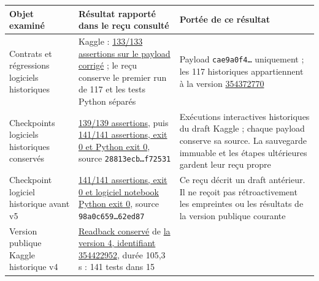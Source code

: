 \documentclass[
  canadien,
  11pt,
  a4paper,
]{report}
\newcounter{none} %
\begin{document}
{\def\LTcaptype{none} %
\begin{longtable}[]{@{}
  >{\raggedright\arraybackslash}p{}
  >{\raggedright\arraybackslash}p{}
  >{\raggedright\arraybackslash}p{}@{}}
\toprule\noalign{}
\begin{minipage}[b]{\linewidth}\raggedright
Objet examiné
\end{minipage} & \begin{minipage}[b]{\linewidth}\raggedright
Résultat rapporté dans le reçu consulté
\end{minipage} & \begin{minipage}[b]{\linewidth}\raggedright
Portée de ce résultat
\end{minipage} \\
\midrule\noalign{}
\endhead
\bottomrule\noalign{}
\endlastfoot
Contrats et régressions logiciels historiques & Kaggle :
\href{../../../../receipts/formation/software-133-final.json}{133/133
assertions sur le payload corrigé} ; le reçu conserve le premier run de
117 et les tests Python séparés & Payload \texttt{cae9a0f4…} uniquement
; les 117 historiques appartiennent à la version
\href{https://www.kaggle.com/code/celebrum/orbit-formation-software-validation?scriptVersionId=354372770}{354372770} \\
Checkpoints logiciels historiques conservés &
\href{../../../../receipts/formation/software-139-kaggle.json}{139/139
assertions}, puis
\href{../../../../receipts/formation/software-141-kaggle.json}{141/141
assertions, exit 0 et Python exit 0}, source \texttt{28813ecb…f72531} &
Exécutions interactives historiques du draft Kaggle ; chaque payload
conserve sa source. La sauvegarde immuable et les étapes ultérieures
gardent leur reçu propre \\
Checkpoint logiciel historique avant v5 &
\href{../../../../receipts/formation/software-141-final-kaggle.json}{141/141
assertions, exit 0 et logiciel notebook Python exit 0}, source
\texttt{98a0c659…62ed87} & Ce reçu décrit un draft antérieur. Il ne
reçoit pas rétroactivement les empreintes ou les résultats de la version
publique courante \\
Version publique Kaggle historique v4 &
\href{../../../../receipts/formation/software-version4-kaggle.json}{Readback
conservé} de
\href{https://www.kaggle.com/code/celebrum/orbit-formation-software-validation?scriptVersionId=354422952}{la
version 4, identifiant 354422952}, durée 105,3 s : 141 tests dans 15

\end{longtable}}
\end{document}
